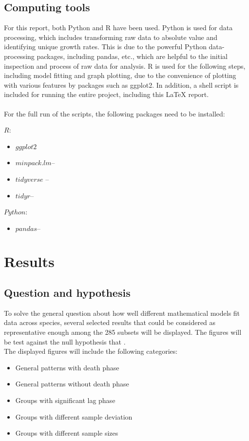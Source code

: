 \documentclass[11pt, oneside]{article}
\begin{document}
 		\subsection{Computing tools}
		For this report, both Python and R have been used. Python is used for data processing, which includes transforming raw data to absolute value and identifying unique growth rates. This is due to the powerful Python data-processing packages, including pandas, etc., which are helpful to the initial inspection and process of raw data for analysis. R is used for the following steps, including model fitting and graph plotting, due to the convenience of plotting with various features by packages such as ggplot2. In addition, a shell script is included for running the entire project, including this LaTeX report. \\
		\\
		For the full run of the scripts, the following packages need to be installed: 
 
 	\noindent \(R:\)
 	\begin{itemize}
	\item \(ggplot2\)
	\item \(minpack.lm\)--
	\item \(tidyverse\) --
	\item \(tidyr\)--
	\end{itemize}
	\(Python:\)
	\begin{itemize}
	\item \(pandas\)--
	\end{itemize}
		\pagebreak
	\section{Results}
	
		\subsection{Question and hypothesis}
		
		To solve the general question about how well different mathematical models fit data across species, several selected results that could be considered as representative enough among the 285 subsets will be displayed. The figures will be test against the null hypothesis that . \\The displayed figures will include the following categories:
		\begin{itemize}
		\item General patterns with death phase
		\item General patterns without death phase
		\item Groups with significant lag phase
		\item Groups with different sample deviation
		\item Groups with different sample sizes
		\end{itemize}
		
\end{document}
